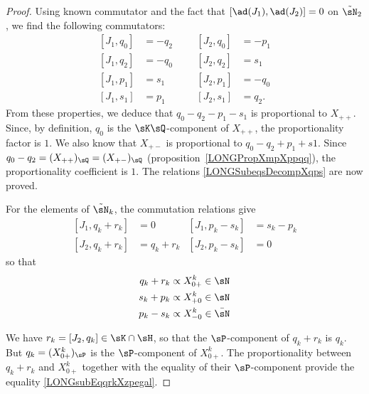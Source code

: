 \begin{proof}


	Using known commutator and the fact that $[\ad(J_1),\ad(J_2)]=0$ on $\tilde\sN_2$, we find the following commutators:
	\begin{subequations}
		\begin{align}
			[J_1,q_0]&=-q_2	&&	&[J_2,q_0]&=-p_1			\label{LONGsubEqJunqzJdeuxqzmoinspun}\\
			[J_1,q_2]&=-q_0	&&	&[J_2,q_2]&=s_1\label{LONGsubEqJunqzJdeuxqzmoinspdeux}\\
			[J_1,p_1]&=s_1	&&	&[J_2,p_1]&=-q_0\\
			[J_1,s_1]&=p_1	&&	&[J_2,s_1]&=q_2.
		\end{align}
	\end{subequations}
	From these properties, we deduce that $q_0-q_2-p_1-s_1$ is proportional to $X_{++}$. Since, by definition, $q_0$ is the $\sK\sQ$-component of $X_{++}$, the proportionality factor is $1$. We also know that  $X_{+-}$ is proportional to $q_0-q_2+p_1+s1$. Since $q_0-q_2=(X_{++})_{\sQ}=(X_{+-})_{\sQ}$ (proposition~\ref{LONGPropXmpXppqq}), the proportionality coefficient is $1$. The relations \eqref{LONGSubeqsDecompXqps} are now proved.

	For the elements of $\tilde\sN_k$, the commutation relations give
	\begin{subequations}
		\begin{align}
			[J_1,q_k+r_k]&=0		&[J_1,p_k-s_k]&=s_k-p_k\\
			[J_2,q_k+r_k]&=q_k+r_k		&[J_2,p_k-s_k]&=0
		\end{align}
	\end{subequations}
	so that
	\begin{equation}
		\begin{aligned}[]
			q_k+r_k&\propto X_{0+}^k\in\sN\\
			s_k+p_k&\propto X^k_{+0}\in\sN\\
			p_k-s_k&\propto X^k_{-0}\in\bar\sN
		\end{aligned}
	\end{equation}

	We have $r_k=[J_2,q_k]\in\sK\cap\sH$, so that the $\sP$-component of $q_k+r_k$ is $q_k$. But $q_k=(X_{0+}^k)_{\sP}$ is the $\sP$-component of $X_{0+}^k$. The proportionality between $q_k+r_k$ and $X_{0+}^k$ together with the equality of their $\sP$-component provide the equality \eqref{LONGsubEqqrkXzpegal}.


\end{proof}
